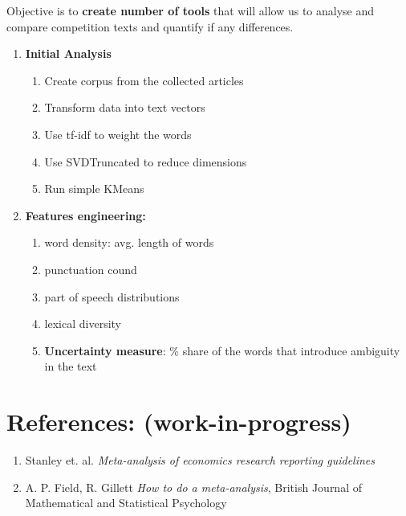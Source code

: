 \documentclass{article}
\begin{document}
Objective is to \textbf{create number of tools} that will allow us to analyse and compare competition texts and quantify if any differences. \\
\begin{enumerate}
    \item \textbf{Initial Analysis}
        \begin{enumerate}
            \item Create corpus from the collected articles
            \item Transform data into text vectors
            \item Use tf-idf to weight the words
            \item Use SVDTruncated to reduce dimensions
            \item Run simple KMeans
        \end{enumerate}

    \item \textbf{Features engineering:}
        \begin{enumerate}
            \item word density: avg. length of words
            \item punctuation cound
            \item part of speech distributions
            \item lexical diversity
            \item \textbf{Uncertainty measure}: \% share of the words that introduce ambiguity in the text
        \end{enumerate}

\end{enumerate}
\newpage

\section*{References: (work-in-progress)}

\begin{enumerate}
    \item Stanley et. al. \textit{Meta-analysis of economics research reporting guidelines}
    \item A. P. Field, R. Gillett \textit{How to do a meta-analysis}, British Journal of Mathematical and Statistical Psychology
\end{enumerate}
\end{document}
